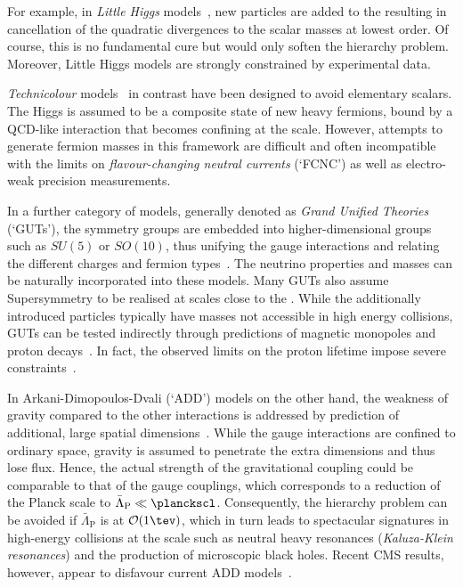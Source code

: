 For example, in \emph{Little Higgs} models~\cite{ArkaniHamed2001232,1126-6708-2002-08-020,doi:10.1146/annurev.nucl.55.090704.151502}, new particles are added to the \sm resulting in cancellation of the quadratic divergences to the scalar masses at lowest order.
Of course, this is no fundamental cure but would only soften the hierarchy problem.
Moreover, Little Higgs models are strongly constrained by experimental data.

\emph{Technicolour} models~\cite{PhysRevD.13.974,PhysRevD.20.2619,Dimopoulos1979237,Eichten1980125,PhysRevD.76.055005} in contrast have been designed to avoid elementary scalars.
The Higgs is assumed to be a composite state of new heavy fermions, bound by a QCD-like interaction that becomes confining at the \tevnospace scale.
However, attempts to generate fermion masses in this framework are difficult and often incompatible with the limits on \emph{flavour-changing neutral currents} (`FCNC') as well as electro-weak precision measurements.

In a further category of models, generally denoted as \emph{Grand Unified Theories} (`GUTs'), the \sm symmetry groups are embedded into higher-dimensional groups such as $SU(5)$ or $SO(10)$, thus unifying the gauge interactions and relating the different charges and fermion types~\cite{Georgi:1974sy,bib:GUT:Fritzsch,PhysRevLett.33.451}.
The neutrino properties and masses can be naturally incorporated into these models.
Many GUTs also assume Supersymmetry to be realised at scales close to the \sm.
While the additionally introduced particles typically have masses not accessible in high energy collisions, GUTs can be tested indirectly through predictions of magnetic monopoles and proton decays~\cite{Gt1974276,bib:GUT:BaryonNumberViolation}.
In fact, the observed limits on the proton lifetime impose severe constraints~\cite{PhysRevLett.102.141801}.

In Arkani-Dimopoulos-Dvali (`ADD') models on the other hand, the weakness of gravity compared to the other interactions is addressed by prediction of additional, large spatial dimensions~\cite{ArkaniHamed1998263,PhysRevD.59.086004}.
While the gauge interactions are confined to ordinary space, gravity is assumed to penetrate the extra dimensions and thus lose flux.
Hence, the actual strength of the gravitational coupling could be comparable to that of the gauge couplings, which corresponds to a reduction of the Planck scale to \mbox{$\bar{\Lambda}_{\text{P}} \ll \planckscl$}.
Consequently, the hierarchy problem can be avoided if $\bar{\Lambda}_{\text{P}}$ is at \mbox{$\mathcal{O}(1\tev)$}, which in turn leads to spectacular signatures in high-energy collisions at the \tevnospace scale such as neutral heavy resonances (\emph{Kaluza-Klein resonances}) and the production of microscopic black holes.
Recent CMS results, however, appear to disfavour current ADD models~\cite{Khachatryan2011434}.

